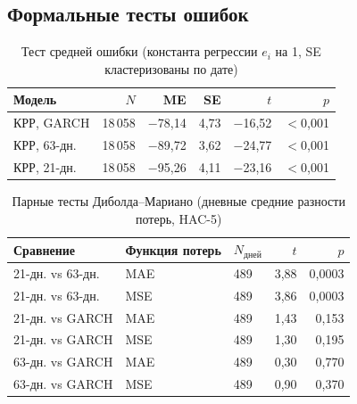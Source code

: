 \documentclass[11pt,a4paper]{article}
\begin{document}
\subsection{Формальные тесты ошибок}

\begin{table}[H]
\centering
\caption{Тест средней ошибки (константа регрессии $e_i$ на 1, SE кластеризованы по дате)}
\label{tab:me-test}
\small
\begin{tabular}{lrrrrr}
\toprule
Модель & $N$ & ME & SE & $t$ & $p$ \\
\midrule
КРР, GARCH   & 18\,058 & $-$78,14 & 4,73 & $-$16,52 & $<$0,001 \\
КРР, 63-дн.  & 18\,058 & $-$89,72 & 3,62 & $-$24,77 & $<$0,001 \\
КРР, 21-дн.  & 18\,058 & $-$95,26 & 4,11 & $-$23,16 & $<$0,001 \\
\bottomrule
\end{tabular}
\end{table}

\begin{table}[H]
\centering
\caption{Парные тесты Диболда--Мариано (дневные средние разности потерь, HAC-5)}
\label{tab:dm-test}
\small
\begin{tabular}{lllrr}
\toprule
Сравнение & Функция потерь & $N_{\text{дней}}$ & $t$ & $p$ \\
\midrule
21-дн. vs 63-дн. & MAE & 489 & 3,88 & 0,0003 \\
21-дн. vs 63-дн. & MSE & 489 & 3,86 & 0,0003 \\
21-дн. vs GARCH  & MAE & 489 & 1,43 & 0,153  \\
21-дн. vs GARCH  & MSE & 489 & 1,30 & 0,195  \\
63-дн. vs GARCH  & MAE & 489 & 0,30 & 0,770  \\
63-дн. vs GARCH  & MSE & 489 & 0,90 & 0,370  \\
\bottomrule
\end{tabular}
\end{table}
\end{document}
